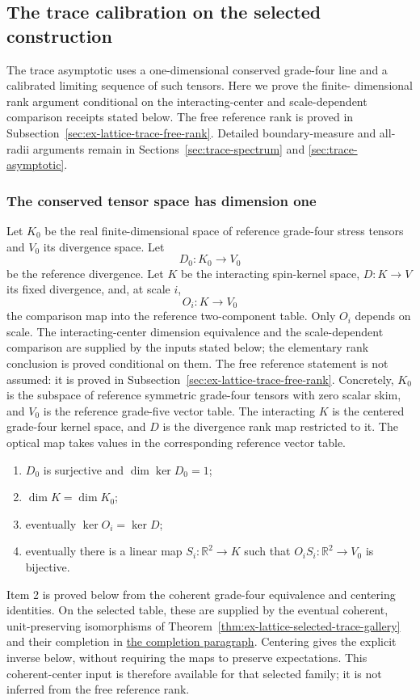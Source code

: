 \subsection{The trace calibration on the selected construction}
\label{sec:ex-lattice-trace-producer}

The trace asymptotic uses a one-dimensional conserved grade-four line and a
calibrated limiting sequence of such tensors. Here we prove the finite-
dimensional rank argument conditional on the interacting-center and
scale-dependent comparison receipts stated below. The free reference rank is
proved in Subsection~\ref{sec:ex-lattice-trace-free-rank}. Detailed
boundary-measure and all-radii arguments remain in Sections~\ref{sec:trace-spectrum}
and \ref{sec:trace-asymptotic}.

\subsubsection{The conserved tensor space has dimension one}

Let $K_0$ be the real finite-dimensional space of reference grade-four
stress tensors and $V_0$ its divergence space. Let
\[
 D_0:K_0\longrightarrow V_0
\]
be the reference divergence. Let $K$ be the interacting spin-kernel space,
$D:K\to V$ its fixed divergence, and, at scale $i$,
\[
 O_i:K\longrightarrow V_0
\]
the comparison map into the reference two-component table. Only $O_i$ depends on scale. The interacting-center dimension
equivalence and the scale-dependent comparison are supplied by the inputs stated
below; the elementary rank conclusion is proved conditional on them. The
free reference statement is not assumed: it is proved in
Subsection~\ref{sec:ex-lattice-trace-free-rank}.
Concretely, $K_0$ is the subspace of reference symmetric grade-four
tensors with zero scalar skim, and $V_0$ is the reference grade-five
vector table. The interacting $K$ is the centered grade-four kernel space,
and $D$ is the divergence rank map restricted to it. The optical map takes
values in the corresponding reference vector table.
\begin{enumerate}
\item $D_0$ is surjective and $\dim\ker D_0=1$;
\item $\dim K=\dim K_0$;
\item eventually $\ker O_i=\ker D$;
\item eventually there is a linear map $S_i:\mathbb R^2\to K$ such
      that $O_iS_i:\mathbb R^2\to V_0$ is bijective.
\end{enumerate}
Item 2 is proved below from the coherent grade-four equivalence and
centering identities. On the selected table, these are supplied by the eventual coherent,
unit-preserving isomorphisms of
Theorem~\ref{thm:ex-lattice-selected-trace-gallery} and their completion
in \hyperref[par:ex-trace-completed-uniform-tests]{the completion paragraph}.
Centering gives the explicit inverse below, without requiring the maps
to preserve expectations. This coherent-center input is therefore
available for that selected family; it is not inferred from the free
reference rank.


